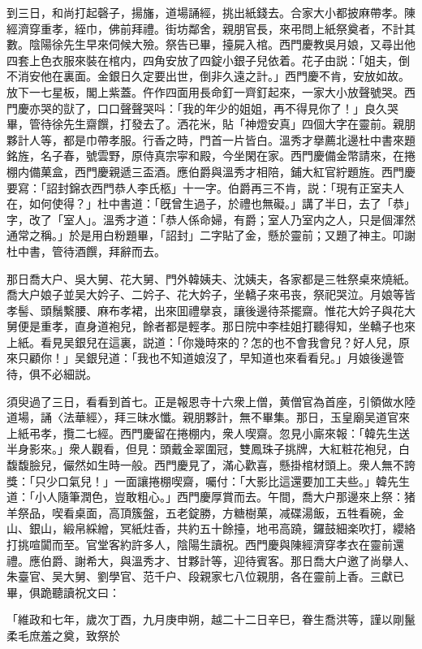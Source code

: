 到三日，和尚打起磬子，揚旛，道場誦經，挑出紙錢去。合家大小都披麻帶孝。陳經濟穿重孝，絰巾，佛前拜禮。街坊鄰舍，親朋官長，來弔問上紙祭奠者，不計其數。陰陽徐先生早來伺候大殮。祭告已畢，擡屍入棺。西門慶教吳月娘，又尋出他四套上色衣服來裝在棺内，四角安放了四錠小銀子兒依着。花子由説：「姐夫，倒不消安他在裏面。金銀日久定要出世，倒非久遠之計。」西門慶不肯，安放如故。放下一七星板，閣上紫蓋。仵作四面用長命釘一齊釘起來，一家大小放聲號哭。西門慶亦哭的獃了，口口聲聲哭呌：「我的年少的姐姐，再不得見你了！」良久哭畢，管待徐先生齋饌，打發去了。洒花米，貼「神燈安真」四個大字在靈前。親朋夥計人等，都是巾帶孝服。行香之時，門首一片皆白。溫秀才擧薦北邊杜中書來題銘旌，名子春，號雲野，原侍真宗寜和殿，今坐閑在家。西門慶備金幣請來，在捲棚内備菓盒，西門慶親遞三盃酒。應伯爵與溫秀才相陪，鋪大紅官紵題旌。西門慶要寫：「詔封錦衣西門恭人李氏柩」十一字。伯爵再三不肯，説：「現有正室夫人在，如何使得？」杜中書道：「旣曾生過子，於禮也無礙。」講了半日，去了「恭」字，改了「室人」。溫秀才道：「恭人係命婦，有爵；室人乃室内之人，只是個渾然通常之稱。」於是用白粉題畢，「詔封」二字貼了金，懸於靈前；又題了神主。叩謝杜中書，管待酒饌，拜辭而去。

那日喬大户、吳大舅、花大舅、門外韓姨夫、沈姨夫，各家都是三牲祭桌來燒紙。喬大户娘子並吴大妗子、二妗子、花大妗子，坐轎子來弔丧，祭祀哭泣。月娘等皆孝髻、頭鬚繫腰、麻布孝裙，出來囬禮擧哀，讓後邊待茶擺齋。惟花大妗子與花大舅便是重孝，直身道袍兒，餘者都是輕孝。那日院中李桂姐打聽得知，坐轎子也來上紙。看見吴銀兒在這裏，説道：「你幾時來的？怎的也不會我會兒？好人兒，原來只顧你！」吴銀兒道：「我也不知道娘沒了，早知道也來看看兒。」月娘後邊管待，俱不必細説。

須臾過了三日，看看到首七。正是報恩寺十六衆上僧，黄僧官為首座，引領做水陸道場，誦〈法華經〉，拜三昧水懺。親朋夥計，無不畢集。那日，玉皇廟吴道官來上紙弔孝，攬二七經。西門慶留在捲棚内，衆人喫齋。忽見小廝來報：「韓先生送半身影來。」衆人觀看，但見：頭戴金翠圍冠，雙鳳珠子挑牌，大紅粧花袍兒，白馥馥臉兒，儼然如生時一般。西門慶見了，滿心歡喜，懸掛棺材頭上。衆人無不誇獎：「只少口氣兒！」一面讓捲棚喫齋，囑付：「大影比這還要加工夫些。」韓先生道：「小人隨筆潤色，豈敢粗心。」西門慶厚賞而去。午間，喬大户那邊來上祭：猪羊祭品，喫看桌面，高頂簇盤，五老錠勝，方糖樹菓，减碟湯飯，五牲看碗，金山、銀山，緞帛綵繒，冥紙炷香，共約五十餘擡，地弔高蹺，鑼鼓細楽吹打，纓絡打挑喧闐而至。官堂客約許多人，陰陽生讀祝。西門慶與陳經濟穿孝衣在靈前還禮。應伯爵、謝希大，與溫秀才、甘夥計等，迎待賓客。那日喬大户邀了尚擧人、朱臺官、吴大舅、劉學官、范千户、段親家七八位親朋，各在靈前上香。三獻已畢，俱跪聽讀祝文曰：

「維政和七年，歲次丁酉，九月庚申朔，越二十二日辛巳，眷生喬洪等，謹以剛鬣柔毛庶羞之奠，致祭於

